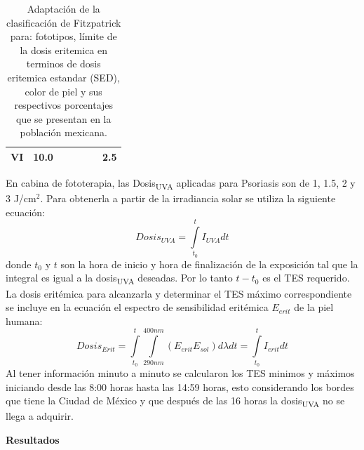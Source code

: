 \documentclass{article}
\begin{document}
\begin{multicols}{2}
\begin{center}
\begin{table}[H]
\begin{tabulary}{1.0\linewidth}{ccccccc}
        VI 	&10.0 	&	&  &	&	&2.5	\\ \hline
    \end{tabulary}
    \caption{{Adaptación de la clasificación de Fitzpatrick para: fototipos, límite de la dosis eritemica en terminos de dosis eritemica estandar (SED), color de piel y sus respectivos porcentajes que se presentan en la población mexicana.{\label{fig:fototipo}}}}
    \end{table}
\end{center}
 \vspace{-0.5cm}
En cabina de fototerapia, las Dosis\textsubscript{UVA} aplicadas para Psoriasis son de 1, 1.5, 2 y 3 J/cm$^2$. 
Para obtenerla a partir de la irradiancia solar se utiliza la siguiente ecuación:
\begin{equation*}
    Dosis_{UVA}= \int\limits_{t_0}^{t}I_{UVA}dt
\end{equation*}
donde $t_0$ y $t$ son la hora de inicio y hora de finalización de la exposición tal que la integral es igual a la dosis\textsubscript{UVA} deseadas.
Por lo tanto $t-t_0$ es el TES requerido. La dosis eritémica para alcanzarla y determinar el TES máximo correspondiente se incluye en la ecuación el espectro de sensibilidad eritémica $E_{erit}$ de la piel humana:
\begin{equation*}
    Dosis_{Erit}=\int\limits_{t_0}^{t} \int\limits_{290nm}^{400nm} \left( E_{erit}E_{sol}\right)d\lambda dt = \int\limits_{t_0}^{t}I_{erit}dt
\end{equation*}
Al tener información minuto a minuto se calcularon los TES minimos y máximos iniciando desde las 8:00 horas hasta las 14:59 horas, esto considerando los bordes que tiene la Ciudad de México y que después de las 16 horas la dosis\textsubscript{UVA} no se llega a adquirir.
\begin{center}
\begin{shaded}
\textbf{\textcolor{na}{Resultados}}
\end{shaded}
\end{center}
\vspace{-0.2cm}
\begin{figure}[H]
    \centering

\end{figure}
\end{multicols}
\end{document}
